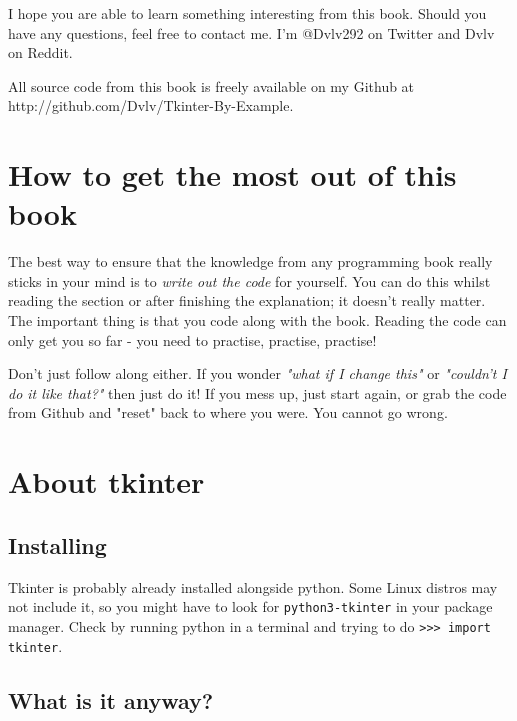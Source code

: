 \documentclass[a4paper,11pt,openany]{book}
\newcommand{\myGithub}{http://github.com/Dvlv/Tkinter-By-Example}
\begin{document}
\vspace{5mm}

I hope you are able to learn something interesting from this book. Should you have any questions, feel free to contact me. I'm @Dvlv292 on Twitter and Dvlv on Reddit. 

\vspace{5mm}

All source code from this book is freely available on my Github at \myGithub{}.  

\section{How to get the most out of this book}

The best way to ensure that the knowledge from any programming book really sticks in your mind is to \textit{write out the code} for yourself. You can do this whilst reading the section or after finishing the explanation; it doesn't really matter. The important thing is that you code along with the book. Reading the code can only get you so far - you need to practise, practise, practise! 

\vspace{5mm}

Don't just follow along either. If you wonder \textit{"what if I change this"} or \textit{"couldn't I do it like that?"} then just do it! If you mess up, just start again, or grab the code from Github and "reset" back to where you were. You cannot go wrong. 

\section{About tkinter}

\subsection{Installing}

Tkinter is probably already installed alongside python. Some Linux distros may not include it, so you might have to look for \lstinline[columns=fixed]{python3-tkinter} in your package manager. Check by running python in a terminal and trying to do \lstinline[columns=fixed]{>>> import tkinter}. 

\subsection{What is it anyway?}
\end{document}
